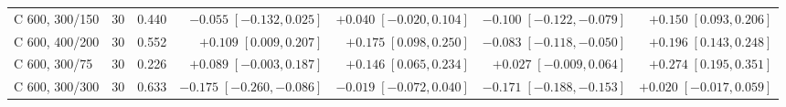\begin{tabular}{lrrrrrr}
C 600, 300/150 & 30 & 0.440 & $-0.055\;[-0.132,0.025]$ & $+0.040\;[-0.020,0.104]$ & $-0.100\;[-0.122,-0.079]$ & $+0.150\;[0.093,0.206]$ \\
C 600, 400/200 & 30 & 0.552 & $+0.109\;[0.009,0.207]$ & $+0.175\;[0.098,0.250]$ & $-0.083\;[-0.118,-0.050]$ & $+0.196\;[0.143,0.248]$ \\
C 600, 300/75 & 30 & 0.226 & $+0.089\;[-0.003,0.187]$ & $+0.146\;[0.065,0.234]$ & $+0.027\;[-0.009,0.064]$ & $+0.274\;[0.195,0.351]$ \\
C 600, 300/300 & 30 & 0.633 & $-0.175\;[-0.260,-0.086]$ & $-0.019\;[-0.072,0.040]$ & $-0.171\;[-0.188,-0.153]$ & $+0.020\;[-0.017,0.059]$ \\
\bottomrule
\end{tabular}
